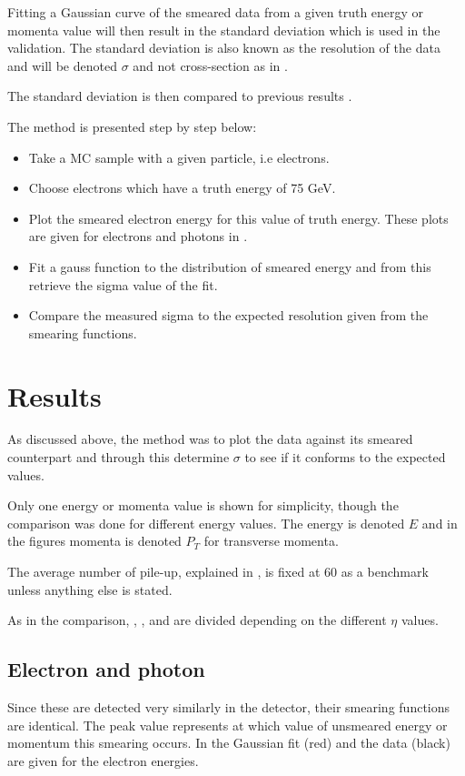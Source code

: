 Fitting a Gaussian curve of the smeared data from a given truth energy or momenta value will then result in the standard deviation which is used in the validation. The standard deviation is also known as the resolution of the data and will be denoted $\sigma$ and not cross-section as in .

The standard deviation is then compared to previous results \citep{ATL-PHYS-PUB-2013-004}.

The method is presented step by step below:
\begin{itemize}
\item Take a MC sample with a given particle, i.e electrons.
\item Choose electrons which have a truth energy of 75 GeV.
\item Plot the smeared electron energy for this value of truth energy. These plots are given for electrons and photons in .
\item Fit a gauss function to the distribution of smeared energy and from this retrieve the sigma value of the fit.
\item Compare the measured sigma to the expected resolution given from the smearing functions.
\end{itemize}

\newpage
\section{Results}\label{cha:vali:sec:results}
As discussed above, the method was to plot the data against its smeared counterpart and through this determine $\sigma$ to see if it conforms to the expected values.

Only one energy or momenta value is shown for simplicity, though the comparison was done for different energy values. The energy is denoted $E$ and in the figures momenta is denoted $P_T$ for transverse momenta.

The average number of pile-up, explained in , is fixed at 60 as a benchmark unless anything else is stated.

As in the comparison, , ,  and  are divided depending on the different $\eta$ values.
\newpage
\subsection{Electron and photon}\label{cha:vali:sec:res:subsec:elph}
Since these are detected very similarly in the detector, their smearing functions are identical.
The peak value represents at which value of unsmeared energy or momentum this smearing occurs. In  the Gaussian fit (red) and the data (black) are given for the electron energies.

